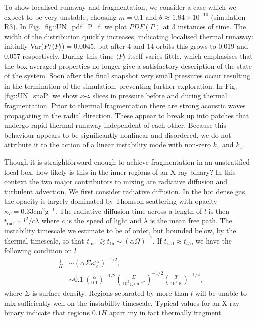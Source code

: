 \documentclass[useAMS]{mn2e}
\begin{document}
To show localised runaway and fragmentation, we consider a case
which we expect to be very unstable, choosing $m=0.1$ and
$\theta\approx1.84\times10^{-10}$ (simulation R3). In Fig.
\ref{fig::UN_pdf_P_f} we plot $PDF(P)$ at $3$ instances of time. 
The width of the distribution quickly increases,
indicating localised thermal runaway: initially Var($P/\langle
P\rangle$)$=0.0045$, but after $4$ and $14$ orbits this grows to
$0.019$ and $0.057$ respectively. During this time $\langle
P\rangle$ itself varies little, which 
emphasises that the box-averaged properties no longer give a
satisfactory description of the state of the system. Soon after the
final snapshot very small pressures occur resulting in the termination
of the simulation, preventing further exploration. In Fig.
\ref{fig::UN_snaP} we show $x$-$z$ slices in pressure before and during
thermal fragmentation. Prior to thermal fragmentation there are strong
acoustic waves propagating in the 
 radial direction. These appear to break up into
 patches that undergo rapid thermal runaway independent of each other.
Because this behaviour appears to be significantly nonlinear and
disordered, we do not attribute it to the action of a linear
instability mode with non-zero $k_x$ and $k_z$.



 

Though it is straightforward enough to achieve fragmentation in 
an unstratified local box, how likely is this in the 
inner regions of an X-ray binary? 
In this context the two major contributors to
mixing are radiative diffusion and turbulent advection. We first consider
radiative diffusion. In the hot dense gas, the opacity is largely
dominated by Thomson scattering with
opacity $\kappa_{T}=0.33\text{cm}^{2}\text{g}^{-1}$. The radiative diffusion
time across a length of $l$ is then $t_{\text{rad}}\sim
l^{2}/c\lambda$ where $c$ is the speed of light and $\lambda$ is the
mean free path. The instability timescale we estimate to be of order,
but bounded below, by the thermal timescale, so that
$ t_{\text{inst}} \gtrsim t_{\text{th}} \sim (\alpha\Omega)^{-1}$. 
If $t_{\text{rad}}\approx t_{th}$, we have the following condition on $l$
\begin{align}
\frac{l}{H}&\sim \left(\alpha\Sigma \kappa
  \frac{c_s}{c}\right)^{-1/2}, \\
&\sim
0.1\,\left(\frac{\alpha}{0.1}\right)^{-1/2}\left(\frac{\Sigma}{10^5\,
    \text{g cm}^{-2}}\right)^{-1/2}\left(\frac{T}{10^7 \,\text{K}}\right)^{-1/4},
\end{align}
where $\Sigma$ is surface density.
Regions separated by more than $l$ will be unable to mix
sufficiently well on the instability timescale. Typical values for an X-ray binary indicate that regions 
$0.1 H$ apart my in fact thermally fragment.
\end{document}
